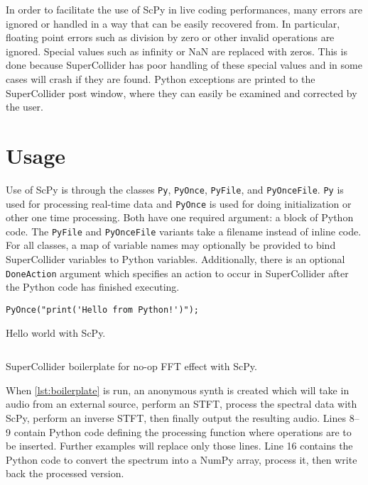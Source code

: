 \documentclass{article}
\begin{document}
In order to facilitate the use of ScPy in live coding performances, many errors are ignored or
handled in a way that can be easily recovered from. In particular, floating point errors such as
division by zero or other invalid operations are ignored. Special values such as infinity or NaN
are replaced with zeros. This is done because SuperCollider has poor handling of these special
values and in some cases will crash if they are found. Python exceptions are printed to the
SuperCollider post window, where they can easily be examined and corrected by the user.

\section{Usage}\label{sec:usage}

Use of ScPy is through the classes \texttt{Py}, \texttt{PyOnce}, \texttt{PyFile}, and
\texttt{PyOnceFile}. \texttt{Py} is used for processing real-time data and \texttt{PyOnce} is used
for doing initialization or other one time processing. Both have one required argument: a block of
Python code. The \texttt{PyFile} and \texttt{PyOnceFile} variants take a filename instead of inline
code. For all classes, a map of variable names may optionally be provided to bind SuperCollider
variables to Python variables. Additionally, there is an optional \texttt{DoneAction} argument
which specifies an action to occur in SuperCollider after the Python code has finished executing.

\begin{listing}[ht]
    \begin{verbatim}
PyOnce("print('Hello from Python!')");
    \end{verbatim}
    \caption{Hello world with ScPy.}
    \label{lst:helloworld}
\end{listing}

\begin{listing}[ht]
    \inputminted[linenos=true]{SuperCollider}{../examples/template.sc}
    \caption{SuperCollider boilerplate for no-op FFT effect with ScPy.}
    \label{lst:boilerplate}
\end{listing}

When \autoref{lst:boilerplate} is run, an anonymous synth is created which will take in audio
from an external source, perform an STFT, process the spectral data with ScPy, perform an inverse
STFT, then finally output the resulting audio. Lines 8--9 contain Python code defining the
processing function where operations are to be inserted. Further examples will replace only those
lines. Line 16 contains the Python code to convert the spectrum into a NumPy array, process it,
then write back the processed version.
\end{document}
